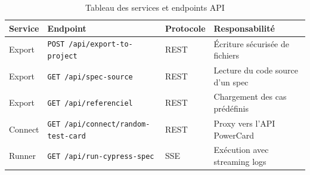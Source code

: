 \begin{table}[H]
\centering\footnotesize
\caption{Tableau des services et endpoints API}
\renewcommand{\arraystretch}{1.3}
\begin{tabularx}{\textwidth}{l l l X}
\toprule
\textbf{Service} & \textbf{Endpoint} & \textbf{Protocole} & \textbf{Responsabilité} \\
\midrule
\rowcolor{primary!5} Export & \texttt{POST /api/export-to-project} & REST & Écriture sécurisée de fichiers \\
Export & \texttt{GET /api/spec-source} & REST & Lecture du code source d'un spec \\
\rowcolor{primary!5} Export & \texttt{GET /api/referenciel} & REST & Chargement des cas prédéfinis \\
Connect & \texttt{GET /api/connect/random-test-card} & REST & Proxy vers l'API PowerCard \\
\rowcolor{primary!5} Runner & \texttt{GET /api/run-cypress-spec} & SSE & Exécution avec streaming logs \\
\bottomrule
\end{tabularx}
\end{table}

